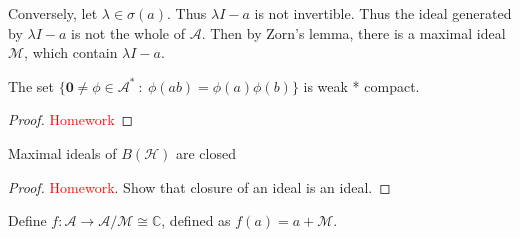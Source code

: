 Conversely, let $\lambda \in \sigma(a)$. Thus $\lambda I - a$ is not
invertible. Thus the ideal generated by $\lambda I - a$ is not the
whole of $\mathcal{A}$. Then by Zorn's lemma, there is a maximal
ideal $\mathcal{M}$, which contain $\lambda I - a$.

\begin{exercise}
  The set $\{ \textbf{0} \neq \phi \in \mathcal{A}^* \ : \
  \phi(ab) = \phi(a) \phi(b) \}$ is weak * compact.
\end{exercise}
\begin{proof}
  \textcolor{red}{Homework}
\end{proof}

\begin{exercise}
  Maximal ideals of $B(\mathcal{H})$ are closed
\end{exercise}
\begin{proof}
  \textcolor{red}{Homework}. Show that closure of an ideal is an ideal.
\end{proof}

Define $f: \mathcal{A} \to \mathcal{A}/\mathcal{M} \cong \mathbb{C}$,
defined as $f(a) = a + \mathcal{M}$.

\begin{theorem}

\end{theorem}
